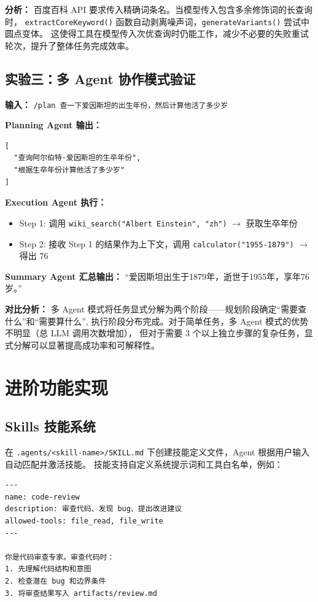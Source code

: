 \documentclass[12pt,a4paper]{ctexart}
\begin{document}
\textbf{分析：} 百度百科 API 要求传入精确词条名。当模型传入包含多余修饰词的长查询时，
\texttt{extractCoreKeyword()}
函数自动剥离噪声词，\texttt{generateVariants()} 尝试中圆点变体。
这使得工具在模型传入次优查询时仍能工作，减少不必要的失败重试轮次，提升了整体任务完成效率。

\subsection{实验三：多 Agent 协作模式验证}

\textbf{输入：} \texttt{/plan 查一下爱因斯坦的出生年份，然后计算他活了多少岁}

\textbf{Planning Agent 输出：}

\begin{lstlisting}[caption={Planning Agent 生成的执行计划}]
[
  "查询阿尔伯特·爱因斯坦的生卒年份",
  "根据生卒年份计算他活了多少岁"
]
\end{lstlisting}

\textbf{Execution Agent 执行：}
\begin{itemize}
  \item Step 1: 调用 \texttt{wiki\_search("Albert Einstein",
    "zh")} $\to$ 获取生卒年份
  \item Step 2: 接收 Step 1 的结果作为上下文，调用
    \texttt{calculator("1955-1879")} $\to$ 得出 76
\end{itemize}

\textbf{Summary Agent 汇总输出：} ``爱因斯坦出生于1879年，逝世于1955年，享年76岁。''

\textbf{对比分析：} 多 Agent 模式将任务显式分解为两个阶段——规划阶段确定``需要查什么''和``需要算什么'',
执行阶段分布完成。对于简单任务，多 Agent 模式的优势不明显（总 LLM 调用次数增加），
但对于需要 3 个以上独立步骤的复杂任务，显式分解可以显著提高成功率和可解释性。

\newpage
\section{进阶功能实现}

\subsection{Skills 技能系统}

在 \verb|.agents/<skill-name>/SKILL.md| 下创建技能定义文件，Agent
根据用户输入自动匹配并激活技能。
技能支持自定义系统提示词和工具白名单，例如：

\begin{lstlisting}[caption={code-review 技能定义（SKILL.md）}]
---
name: code-review
description: 审查代码、发现 bug、提出改进建议
allowed-tools: file_read, file_write
---

你是代码审查专家。审查代码时：
1. 先理解代码结构和意图
2. 检查潜在 bug 和边界条件
3. 将审查结果写入 artifacts/review.md
\end{lstlisting}
\end{document}
